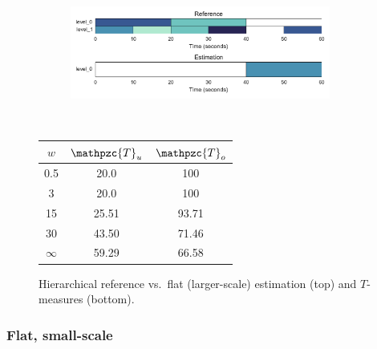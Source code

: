 \documentclass{article}
\def\shag{\ensuremath{\mathpzc{T}}}
\begin{document}
\begin{figure}
  \centering
  \begin{subfigure}{0.5\textwidth}
    \centering
    \includegraphics[width=0.94\textwidth]{figs/hier-flatlarger.pdf}
  \end{subfigure}%
  \\
  \begin{minipage}{0.5\textwidth}
    \centering
    \vspace{10pt}
    \begin{tabular}{|c|c|c|}
      \hline
      $w$       & $\shag_u$    & $\shag_o$      \\
      \hline
      0.5       & 20.0      & 100      \\     
      3         & 20.0      & 100      \\
      15        & 25.51     & 93.71    \\
      30        & 43.50     & 71.46    \\
      $\infty$  & 59.29     & 66.58    \\
      \hline
    \end{tabular}
  \end{minipage}
  \caption{Hierarchical reference vs.\ flat (larger-scale) estimation (top) and $T$-measures (bottom).}
  \label{fig:hier-flatlarger}
\end{figure}
\subsubsection{Flat, small-scale}
\end{document}
